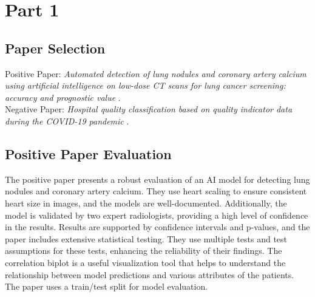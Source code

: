 \section{Part 1}

	\subsection{Paper Selection}
		Positive Paper: \emph{Automated detection of lung nodules and coronary artery calcium using artificial intelligence on low-dose CT scans for lung cancer screening: accuracy and prognostic value} \cite{paperX}.\\
		Negative Paper: \emph{Hospital quality classification based on quality indicator data during the COVID-19 pandemic} \cite{paperY}.

	\subsection{Positive Paper Evaluation}
		The positive paper presents a robust evaluation of an AI model for detecting lung nodules and coronary artery calcium.
		They use heart scaling to ensure consistent heart size in images, and the models are well-documented.
		Additionally, the model is validated by two expert radiologists, providing a high level of confidence in the
		results.
		Results are supported by confidence intervals and p-values, and the paper includes extensive
		statistical testing.
		They use multiple tests and test assumptions for these tests, enhancing the
		reliability of their findings.
		The correlation biplot is a useful visualization tool that helps to understand the relationship between
		model predictions and various attributes of the patients.
		The paper uses a train/test split for model
		evaluation.

